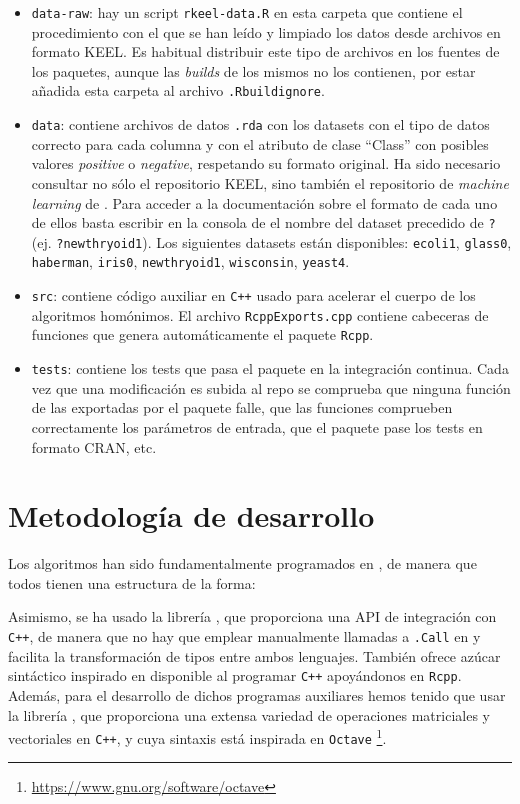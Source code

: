 \begin{itemize}
 \item \texttt{data-raw}: hay un script \texttt{rkeel-data.R} en esta carpeta que contiene el procedimiento con el que se han
 leído y limpiado los datos desde archivos en formato KEEL. Es habitual distribuir este tipo de archivos en los fuentes de
 los paquetes, aunque las \textit{builds} de los mismos no los contienen, por estar añadida esta carpeta al archivo \texttt{.Rbuildignore}.
 \item \texttt{data}: contiene archivos de datos \texttt{.rda} con los datasets con el tipo de datos 
 correcto para cada columna y con el atributo de clase ``Class'' con posibles valores \textit{positive} o \textit{negative}, 
 respetando su formato original. Ha sido necesario consultar no sólo el repositorio KEEL, sino también el repositorio 
 de \textit{machine learning} de . Para acceder a la documentación sobre el formato de cada uno de ellos 
 basta escribir en la consola de \R el nombre del dataset precedido de \texttt{?} (ej. \texttt{?newthryoid1}). Los
 siguientes datasets están disponibles: \texttt{ecoli1}, \texttt{glass0}, \texttt{haberman}, \texttt{iris0},
 \texttt{newthryoid1}, \texttt{wisconsin}, \texttt{yeast4}.
 \item \texttt{src}: contiene código auxiliar en \texttt{C++} usado para acelerar el cuerpo de los algoritmos homónimos. El
 archivo \texttt{RcppExports.cpp} contiene cabeceras de funciones que genera automáticamente el paquete \texttt{Rcpp}.
 \item \texttt{tests}: contiene los tests que pasa el paquete en la integración continua. Cada vez que una modificación 
 es subida al repo se comprueba que ninguna función de las exportadas por el paquete falle, que las funciones comprueben
 correctamente los parámetros de entrada, que el paquete pase los tests en formato CRAN, etc.
\end{itemize}


\section{Metodología de desarrollo}
Los algoritmos han sido fundamentalmente programados en \R, de manera que todos tienen una estructura de la forma:


Asimismo, se ha usado la librería , que proporciona una API de integración con \texttt{C++}, de manera que
no hay que emplear manualmente llamadas a \texttt{.Call} en \R y facilita la transformación de tipos entre ambos lenguajes. También 
ofrece azúcar sintáctico inspirado en \R disponible al programar \texttt{C++} apoyándonos en \texttt{Rcpp}. Además, para el desarrollo
de dichos programas auxiliares hemos tenido que usar la librería , que proporciona una extensa variedad 
de operaciones matriciales y vectoriales en \texttt{C++}, y cuya sintaxis está inspirada en \texttt{Octave}
\footnote{\url{https://www.gnu.org/software/octave}}.


